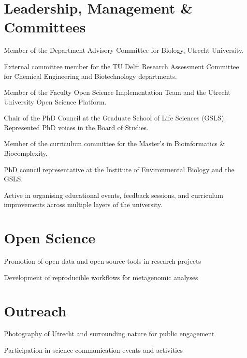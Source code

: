 \documentclass[a4paper,10pt]{article}
\begin{document}
{\begin{minipage}[t]{0.6\textwidth}
\section*{Leadership, Management \& Committees}
\begin{description}
\raggedright
\item[\normalfont \textcolor{ColorOne}{2023 -- now.}] Member of the Department Advisory Committee for Biology, Utrecht University.
\item[\normalfont \textcolor{ColorOne}{2021.}] External committee member for the TU Delft Research Assessment Committee for Chemical Engineering and Biotechnology departments.
\item[\normalfont \textcolor{ColorOne}{2020 -- 2021.}] Member of the Faculty Open Science Implementation Team and the Utrecht University Open Science Platform.
\item[\normalfont \textcolor{ColorOne}{2019 -- 2021.}] Chair of the PhD Council at the Graduate School of Life Sciences (GSLS). Represented PhD voices in the Board of Studies.
\item[\normalfont \textcolor{ColorOne}{2019 -- 2021.}] Member of the curriculum committee for the Master's in Bioinformatics \& Biocomplexity.
\item[\normalfont \textcolor{ColorOne}{2017 -- 2021.}] PhD council representative at the Institute of Environmental Biology and the GSLS.
\item Active in organising educational events, feedback sessions, and curriculum improvements across multiple layers of the university.
\end{description}

\section*{Open Science}
\begin{description}
\raggedright
\item Promotion of open data and open source tools in research projects
\item Development of reproducible workflows for metagenomic analyses
\end{description}

\section*{Outreach}
\begin{description}
\raggedright
\item Photography of Utrecht and surrounding nature for public engagement
\item Participation in science communication events and activities
\end{description}


\end{minipage}}
\end{document}
